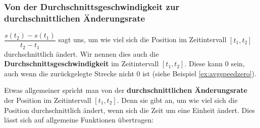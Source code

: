 \subsubsection{Von der Durchschnittsgeschwindigkeit zur durchschnittlichen Änderungsrate}
$\dfrac{s(t_2)-s(t_1)}{t_2-t_1}$ sagt uns, um wie viel sich die Position im Zeitintervall $[t_1,t_2]$ durchschnittlich ändert. Wir nennen dies auch die \textbf{Durchschnittsgeschwindigkeit} im Zeitintervall $[t_1,t_2]$. Diese kann $0$ sein, auch wenn die zurückgelegte Strecke nicht $0$ ist (siehe Beispiel \ref{ex:avgspeedzero}).

Etwas allgemeiner spricht man von der \textbf{durchschnittlichen Änderungsrate} der Position im Zeitintervall $[t_1,t_2]$. Denn sie gibt an, um wie viel sich die Position durchschnittlich ändert, wenn sich die Zeit um eine Einheit ändert. Dies lässt sich auf allgemeine Funktionen übertragen:

